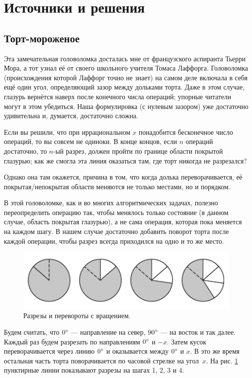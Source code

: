 \section*{Источники и решения}

\subsection*{Торт-мороженое}

Эта замечательная головоломка досталась мне от французского аспиранта Тьерри Мора,
а тот узнал её от своего школьного учителя Томаса Лаффорга.
Головоломка (происхождения которой Лаффорг точно не знает) на самом деле включала в себя ещё один угол, определяющий зазор между дольками торта.
Даже в этом случае, глазурь вернётся наверх после конечного числа операций;
упорные читатели могут в этом убедиться.
Наша формулировка (с нулевым зазором) уже достаточно удивительна и, думается, достаточно сложна.

Если вы решили, что при иррациональном $x$ понадобится бесконечное число операций, то вы совсем не одиноки.
В конце концов, если $n$ операций достаточно, то $n$-ый разрез, должен пройти по границе области покрытой глазурью;
как же смогла эта линия оказаться там, где торт никогда не разрезался?

Однако она там окажется, причина в том, что когда долька переворачивается, её покрытая/непокрытая области  меняются не только местами, но и порядком.

В этой головоломке, как и во многих алгоритмических задачах, полезно переопределить операцию так, чтобы менялось только состояние (в данном случае, область покрытая глазурью), а не сама операция, которая пока меняется на каждом шагу.
В нашем случае достаточно добавить поворот торта после каждой операции, чтобы разрез всегда приходился на одно и то же место.


\begin{figure}[htb!]
\centering
\includegraphics[scale=.9]{pics/tort2}
\caption{Разрезы и перевороты с вращением.}
\label{pic:tort2}
\end{figure}

Будем считать, что $0\degree$ --- направление на север,
$90\degree$ --- на восток и так далее.
Каждый раз будем разрезать по направлениям $0\degree$ и $-x$.
Затем кусок переворачивается через линию $0\degree$ и оказывается между $0\degree$ и $x$.
В это же время остальная часть торта поворачивается по часовой стрелке на угол~$x$.
На рис. \ref{pic:tort2} пунктирные линии показывают разрезы на шагах 1, 2, 3 и 4.


